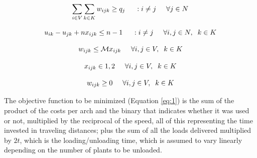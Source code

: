 \documentclass{amsart}
\begin{document}
        
        \begin{equation} \label{eq:5}
            \sum_{i \in V} \sum_{k \in K} w_{ijk} \geq q_j \hspace{0.5cm} : i \neq j \hspace{0.5cm} \forall j \in N
        \end{equation}

        
        \begin{equation} \label{eq:6}
            u_{ik} - u_{jk} + n x_{ijk} \leq n - 1 \hspace{0.5cm} : i \neq j \hspace{0.5cm} \forall i,j \in N, \hspace{0.2cm} k \in K
        \end{equation}

        
        \begin{equation} \label{eq:7}
            w_{ijk} \leq \mathcal{M} x_{ijk} \hspace{0.5cm} \forall i,j \in V, \hspace{0.2cm} k \in K
        \end{equation}

        
        \begin{equation} \label{eq:8}
            x_{ijk} \in {1, 2} \hspace{0.5cm} \forall i,j \in V, \hspace{0.2cm} k \in K
        \end{equation}

        
        \begin{equation} \label{eq:9}
            w_{ijk} \geq 0 \hspace{0.5cm} \forall i,j \in V, \hspace{0.2cm} k \in K
        \end{equation}
        
    
        
        
        \vspace{0.4cm}
        The objective function to be minimized (Equation \ref{eq:1}) is the sum of the product of the costs per arch and the binary that indicates whether it was used or not, multiplied by the reciprocal of the speed, all of this representing the time invested in traveling distances; plus the sum of all the loads delivered multiplied by $2t$, which is the loading/unloading time, which is assumed to vary linearly depending on the number of plants to be unloaded. 
        
\end{document}
